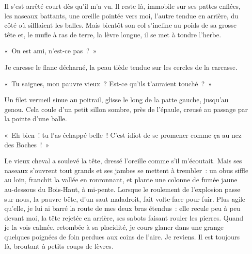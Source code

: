 {

Il s'est arrêté court dès qu'il m'a vu. Il reste là, immobile sur ses pattes enflées, les naseaux battants, une oreille pointée vers moi, l'autre tendue en arrière, du côté où sifflaient les balles. Mais bientôt son col s'incline au poids de sa grosse tête et, le mufle à ras de terre, la lèvre longue, il se met à tondre l'herbe.

«~On est ami, n'est-ce pas~?~»

Je caresse le flanc décharné, la peau tiède tendue sur les cercles de la carcasse.

«~Tu saignes, mon pauvre vieux~? Est-ce qu'ils t'auraient touché~?~»

Un filet vermeil sinue au poitrail, glisse le long de la patte gauche, jusqu'au genou. Cela coule d'un petit sillon sombre, près de l'épaule, creusé au passage par la pointe d'une balle.

«~Eh bien~! tu l'as échappé belle~! C'est idiot de se promener comme ça au nez des Boches~!~»

Le vieux cheval a soulevé la tête, dressé l'oreille comme s'il m'écoutait. Mais ses naseaux s'ouvrent tout grands et ses jambes se mettent à trembler~: un obus siffle au loin, franchit la vallée en ronronnant, et plante une colonne de fumée jaune au-dessous du Bois-Haut, à mi-pente. Lorsque le roulement de l'explosion passe sur nous, la pauvre bête, d'un saut maladroit, fait volte-face pour fuir. Plus agile qu'elle, je lui ai barré la route de mes deux bras étendus~: elle recule peu à peu devant moi, la tête rejetée en arrière, ses sabots faisant rouler les pierres. Quand je la vois calmée, retombée à sa placidité, je cours glaner dans une grange quelques poignées de foin perdues aux coins de l'aire. Je reviens. Il est toujours là, broutant à petits coups de lèvres.

}

